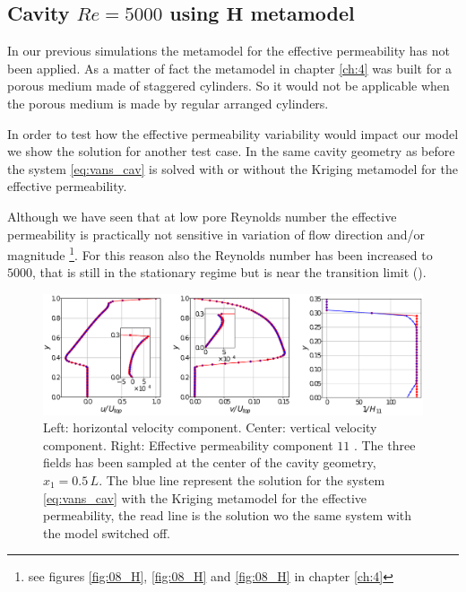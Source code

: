 \subsection{Cavity $Re=5000$ using $\mathbf{H}$ metamodel}
\label{pr:mata_cav}
In our previous simulations the metamodel for the effective permeability has not been applied.  As a matter of fact the metamodel in chapter \ref{ch:4} was built for a porous medium made of staggered cylinders. So it would not be applicable when the porous medium is made by regular arranged cylinders.

In order to test how the effective permeability variability would impact our model we show the solution for another test case. In the same cavity geometry as before the system \eqref{eq:vans_cav} is solved with or without the Kriging metamodel for the effective permeability.

Although we have seen that at low pore Reynolds number the effective permeability is practically not sensitive in variation of flow direction and/or magnitude \footnote{see figures \ref{fig:08_H}, \ref{fig:08_H} and \ref{fig:08_H} in chapter \ref{ch:4}}.
For this reason also the Reynolds number has been increased to $5000$, that is still in the stationary regime but is near the transition limit (\citet{peng2003transition}).

\begin{figure}[h]
	\centering
	\includegraphics[width=0.9\linewidth]{chapter_5/figure/cav_5000}
	\caption{Left: horizontal velocity component. Center: vertical velocity component. Right: Effective permeability component $11$ . The three fields has been sampled at the center of the cavity geometry, $x_1=0.5 \,L$. The blue line represent the solution for the system \eqref{eq:vans_cav} with the Kriging metamodel for the effective permeability, the read line is the solution wo the same system with the model switched off.}
	\label{fig:cav5000}
\end{figure}

